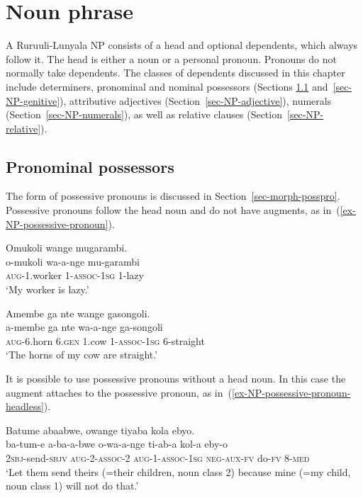 \section{Noun phrase}\label{sec-syntax-NP}

A Ru\-ruu\-li\hyp{}Lu\-nya\-la NP consists of a head and optional dependents, which always follow it.
The head is either a noun or a personal pronoun. 
Pronouns do not normally take dependents. 
The classes of dependents discussed in this chapter include determiners, pronominal and nominal possessors (Sections \ref{sec-NP-possessive-pronoun} and~\ref{sec-NP-genitive}), 
attributive adjectives (Section~\ref{sec-NP-adjective}), numerals (Section~\ref{sec-NP-numerals}), as well as relative clauses (Section~\ref{sec-NP-relative}).

\subsection{Pronominal possessors}\label{sec-NP-possessive-pronoun}

The form of possessive pronouns is discussed in Section~\ref{sec-morph-posspro}. 
Possessive pronouns follow the head noun and do not have augments, as in~(\ref{ex-NP-possessive-pronoun}). 

\ea \label{ex-NP-possessive-pronoun}
\begin{xlist}	
\ex
    \glll    Omukoli wange mugarambi.\\
     o-mukoli wa-a-nge mu-garambi\\
	\textsc{aug}-1.worker 1-\textsc{assoc}-\textsc{1sg} 1-lazy\\
    \glt  `My worker is lazy.’

\ex     \glll   Amembe ga nte wange gasongoli.\\
	  a-membe ga nte wa-a-nge ga-songoli\\
	\textsc{aug}-6.horn 6.\textsc{gen} 1.cow 1-\textsc{assoc}-\textsc{1sg} 6-straight\\
    \glt  `The horns of my cow are straight.’
\end{xlist}	
\z

It is possible to use possessive pronouns without a head noun. In this case the augment attaches to the possessive pronoun, as in~(\ref{ex-NP-possessive-pronoun-headless}).

\ea \label{ex-NP-possessive-pronoun-headless}
    \glll   Batume abaabwe, owange tiyaba kola ebyo.\\
      ba-tum-e a-ba-a-bwe o-wa-a-nge ti-ab-a kol-a eby-o\\
	\textsc{2sbj}-send-\textsc{sbjv} \textsc{aug}-2-\textsc{assoc}-2 \textsc{aug}-1-\textsc{assoc}-\textsc{1sg} \textsc{neg}-\textsc{aux}-\textsc{fv} do-\textsc{fv} 8-\textsc{med}\\
    \glt  `Let them send theirs (=their children, noun class 2) because mine (=my child, noun class 1) will not do that.’
\z

